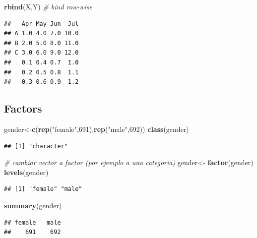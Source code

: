 \documentclass[]{article}
\newenvironment{Shaded}{\begin{snugshade}}{\end{snugshade}}
\newcommand{\KeywordTok}[1]{\textcolor[rgb]{0.13,0.29,0.53}{\textbf{{#1}}}}
\newcommand{\DecValTok}[1]{\textcolor[rgb]{0.00,0.00,0.81}{{#1}}}
\newcommand{\StringTok}[1]{\textcolor[rgb]{0.31,0.60,0.02}{{#1}}}
\newcommand{\CommentTok}[1]{\textcolor[rgb]{0.56,0.35,0.01}{\textit{{#1}}}}
\newcommand{\NormalTok}[1]{{#1}}
\numberwithin{equation}{section}
\begin{document}
\begin{Shaded}
\begin{Highlighting}[]
\KeywordTok{rbind}\NormalTok{(X,Y)  }\CommentTok{# bind row-wise}
\end{Highlighting}
\end{Shaded}

\begin{verbatim}
##   Apr May Jun  Jul
## A 1.0 4.0 7.0 10.0
## B 2.0 5.0 8.0 11.0
## C 3.0 6.0 9.0 12.0
##   0.1 0.4 0.7  1.0
##   0.2 0.5 0.8  1.1
##   0.3 0.6 0.9  1.2
\end{verbatim}

\subsection{Factors}\label{factors}

\begin{Shaded}
\begin{Highlighting}[]
\NormalTok{gender<-}\KeywordTok{c}\NormalTok{(}\KeywordTok{rep}\NormalTok{(}\StringTok{"female"}\NormalTok{,}\DecValTok{691}\NormalTok{),}\KeywordTok{rep}\NormalTok{(}\StringTok{"male"}\NormalTok{,}\DecValTok{692}\NormalTok{))}
\KeywordTok{class}\NormalTok{(gender)}
\end{Highlighting}
\end{Shaded}

\begin{verbatim}
## [1] "character"
\end{verbatim}

\begin{Shaded}
\begin{Highlighting}[]
\CommentTok{# cambiar vector a factor (por ejemplo a una categoria)}
\NormalTok{gender<-}\StringTok{ }\KeywordTok{factor}\NormalTok{(gender)}
\KeywordTok{levels}\NormalTok{(gender)}
\end{Highlighting}
\end{Shaded}

\begin{verbatim}
## [1] "female" "male"
\end{verbatim}

\begin{Shaded}
\begin{Highlighting}[]
\KeywordTok{summary}\NormalTok{(gender)}
\end{Highlighting}
\end{Shaded}

\begin{verbatim}
## female   male 
##    691    692
\end{verbatim}
\end{document}

